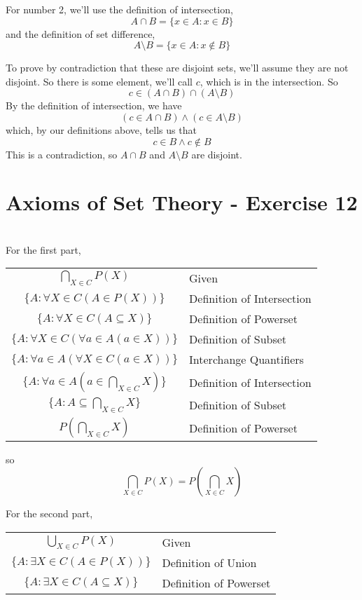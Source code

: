 \documentclass[11pt]{article}
\begin{document}
For number 2, we'll use the definition of intersection,
\[A\cap B = \{x\in A: x\in B\}\]
and the definition of set difference,
\[A\setminus B = \{x\in A: x\notin B\}\]

To prove by contradiction that these are disjoint sets, we'll assume they are not disjoint. So there is some element, we'll call $c$, which is in the intersection. So
\[c\in (A\cap B)\cap(A\setminus B)\]
By the definition of intersection, we have
\[(c \in A\cap B) \land (c \in A\setminus B)\]
which, by our definitions above, tells us that
\[c \in B \land c \notin B\]
This is a contradiction, so $A \cap B$ and $A \setminus B$ are disjoint.


\section*{Axioms of Set Theory - Exercise 12}
\\

For the first part,
\begin{center}
    \def\arraystretch{2}
    \begin{tabular}{c l}
        $\displaystyle\bigcap_{X\in C} P(X)$ & Given \\
        $\{A: \forall X\in C(A \in P(X))\}$ & Definition of Intersection \\
        $\{A: \forall X\in C(A \subseteq X)\}$ & Definition of Powerset \\
        $\{A: \forall X\in C(\forall a\in A (a \in X))\}$ & Definition of Subset \\
        $\{A: \forall a\in A (\forall X\in C(a \in X))\}$ & Interchange Quantifiers \\
        $\{A: \forall a\in A (a \in \displaystyle\bigcap_{X\in C} X)\}$ & Definition of Intersection \\
        $\{A: A \subseteq \displaystyle\bigcap_{X\in C} X\}$ & Definition of Subset \\
        $P(\displaystyle\bigcap_{X\in C} X)$ & Definition of Powerset \\
    \end{tabular}
\end{center}
so
\[\bigcap_{X\in C} P(X) = P(\bigcap_{X\in C} X)\]

For the second part,
\begin{center}
    \def\arraystretch{2}
    \begin{tabular}{c l}
        $\displaystyle\bigcup_{X\in C} P(X)$ & Given \\
        $\{A: \exists X\in C(A \in P(X))\}$ & Definition of Union \\
        $\{A: \exists X\in C(A \subseteq X)\}$ & Definition of Powerset \\
    \end{tabular}
\end{center}
\end{document}
